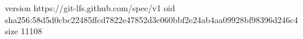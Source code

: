 version https://git-lfs.github.com/spec/v1
oid sha256:58d5d0cbc22485ffcd7822e47852d3c060bbf2e24ab4aa09928bf98396d246c4
size 11108
